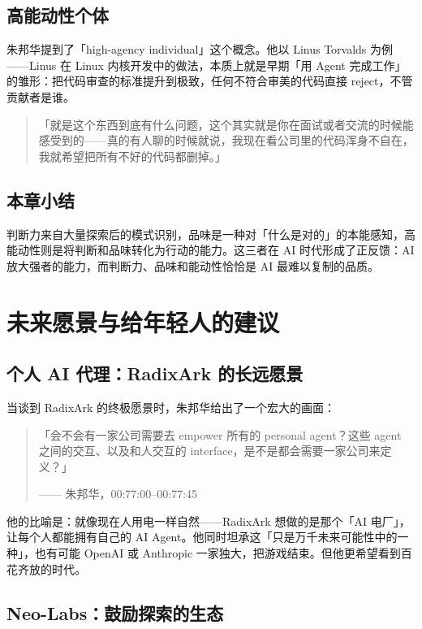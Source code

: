 \documentclass[a4paper]{article}
\begin{document}
\subsection{高能动性个体}

朱邦华提到了「high-agency individual」这个概念。他以 Linus Torvalds 为例——Linus 在 Linux 内核开发中的做法，本质上就是早期「用 Agent 完成工作」的雏形：把代码审查的标准提升到极致，任何不符合审美的代码直接 reject，不管贡献者是谁。

\begin{quote}
「就是这个东西到底有什么问题，这个其实就是你在面试或者交流的时候能感受到的——真的有人聊的时候就说，我现在看公司里的代码浑身不自在，我就希望把所有不好的代码都删掉。」
\end{quote}

\subsection{本章小结}
判断力来自大量探索后的模式识别，品味是一种对「什么是对的」的本能感知，高能动性则是将判断和品味转化为行动的能力。这三者在 AI 时代形成了正反馈：AI 放大强者的能力，而判断力、品味和能动性恰恰是 AI 最难以复制的品质。

\section{未来愿景与给年轻人的建议}

\subsection{个人 AI 代理：RadixArk 的长远愿景}

当谈到 RadixArk 的终极愿景时，朱邦华给出了一个宏大的画面：

\begin{quote}
「会不会有一家公司需要去 empower 所有的 personal agent？这些 agent 之间的交互、以及和人交互的 interface，是不是都会需要一家公司来定义？」\par
\hfill —— 朱邦华，00:77:00--00:77:45
\end{quote}

他的比喻是：就像现在人用电一样自然——RadixArk 想做的是那个「AI 电厂」，让每个人都能拥有自己的 AI Agent。他同时坦承这「只是万千未来可能性中的一种」，也有可能 OpenAI 或 Anthropic 一家独大，把游戏结束。但他更希望看到百花齐放的时代。

\subsection{Neo-Labs：鼓励探索的生态}
\end{document}
